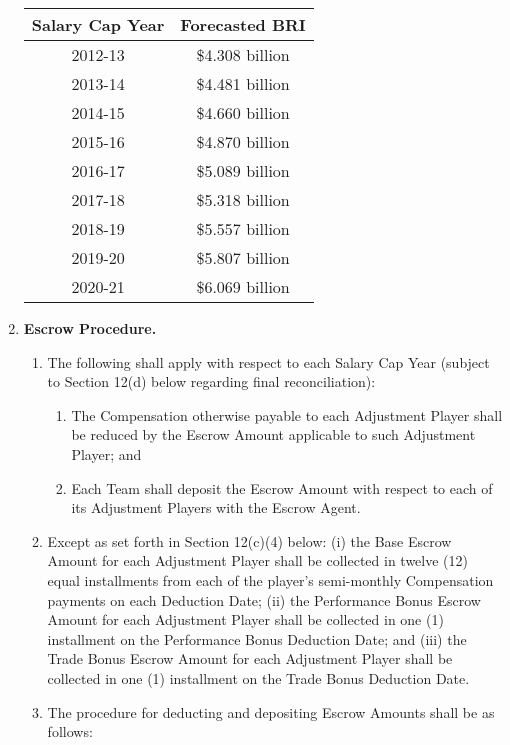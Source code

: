 \documentclass[
]{book}
\providecommand{\tightlist}{%
  \setlength{\itemsep}{0pt}\setlength{\parskip}{0pt}}
\begin{document}
\begin{enumerate}
  \begin{longtable}[]{@{}cc@{}}
  \toprule()
  Salary Cap Year & Forecasted BRI \\
  \midrule()
  \endhead
  2012-13 & \$4.308 billion \\
  2013-14 & \$4.481 billion \\
  2014-15 & \$4.660 billion \\
  2015-16 & \$4.870 billion \\
  2016-17 & \$5.089 billion \\
  2017-18 & \$5.318 billion \\
  2018-19 & \$5.557 billion \\
  2019-20 & \$5.807 billion \\
  2020-21 & \$6.069 billion \\
  \bottomrule()
  \end{longtable}
\item
  \textbf{Escrow Procedure.}

  \begin{enumerate}
  \def\labelenumii{(\arabic{enumii})}
  \tightlist
  \item
    The following shall apply with respect to each Salary Cap Year (subject to Section 12(d) below regarding final reconciliation):

    \begin{enumerate}
    \def\labelenumiii{(\roman{enumiii})}
    \tightlist
    \item
      The Compensation otherwise payable to each Adjustment Player shall be reduced by the Escrow Amount applicable to such Adjustment Player; and
    \item
      Each Team shall deposit the Escrow Amount with respect to each of its Adjustment Players with the Escrow Agent.
    \end{enumerate}
  \item
    Except as set forth in Section 12(c)(4) below: (i) the Base Escrow Amount for each Adjustment Player shall be collected in twelve (12) equal installments from each of the player's semi-monthly Compensation payments on each Deduction Date; (ii) the Performance Bonus Escrow Amount for each Adjustment Player shall be collected in one (1) installment on the Performance Bonus Deduction Date; and (iii) the Trade Bonus Escrow Amount for each Adjustment Player shall be collected in one (1) installment on the Trade Bonus Deduction Date.
  \item
    The procedure for deducting and depositing Escrow Amounts shall be as follows:


\end{enumerate}
\end{enumerate}
\end{document}
